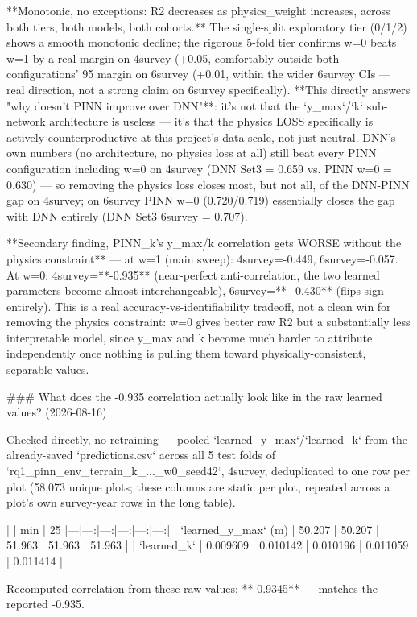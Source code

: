 **Monotonic, no exceptions: R2 decreases as physics_weight increases, across both tiers, both
models, both cohorts.** The single-split exploratory tier (0/1/2) shows a smooth monotonic
decline; the rigorous 5-fold tier confirms w=0 beats w=1 by a real margin on 4survey (+0.05,
comfortably outside both configurations' 95%
margin on 6survey (+0.01, within the wider 6survey CIs — real direction, not a strong claim on
6survey specifically). **This directly answers "why doesn't PINN improve over DNN"**: it's not
that the `y_max`/`k` sub-network architecture is useless — it's that the physics LOSS specifically
is actively counterproductive at this project's data scale, not just neutral. DNN's own numbers
(no architecture, no physics loss at all) still beat every PINN configuration including w=0 on
4survey (DNN Set3 = 0.659 vs. PINN w=0 = 0.630) — so removing the physics loss closes most, but
not all, of the DNN-PINN gap on 4survey; on 6survey PINN w=0 (0.720/0.719) essentially closes the
gap with DNN entirely (DNN Set3 6survey = 0.707).

**Secondary finding, PINN_k's y_max/k correlation gets WORSE without the physics constraint** —
at w=1 (main sweep): 4survey=-0.449, 6survey=-0.057. At w=0: 4survey=**-0.935** (near-perfect
anti-correlation, the two learned parameters become almost interchangeable), 6survey=**+0.430**
(flips sign entirely). This is a real accuracy-vs-identifiability tradeoff, not a clean win for
removing the physics constraint: w=0 gives better raw R2 but a substantially less interpretable
model, since y_max and k become much harder to attribute independently once nothing is pulling
them toward physically-consistent, separable values.

### What does the -0.935 correlation actually look like in the raw learned values? (2026-08-16)

Checked directly, no retraining — pooled `learned_y_max`/`learned_k` from the already-saved
`predictions.csv` across all 5 test folds of `rq1_pinn_env_terrain_k_..._w0_seed42`, 4survey,
deduplicated to one row per plot (58,073 unique plots; these columns are static per plot, repeated
across a plot's own survey-year rows in the long table).

| | min | 25%
|---|---:|---:|---:|---:|---:|
| `learned_y_max` (m) | 50.207 | 50.207 | 51.963 | 51.963 | 51.963 |
| `learned_k` | 0.009609 | 0.010142 | 0.010196 | 0.011059 | 0.011414 |

Recomputed correlation from these raw values: **-0.9345** — matches the reported -0.935.

